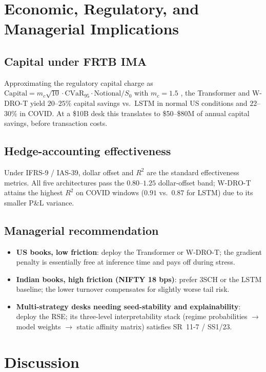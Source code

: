 \documentclass[11pt,a4paper]{article}
\newcommand{\cvar}{\mathrm{CVaR}}
\begin{document}
\section{Economic, Regulatory, and Managerial Implications}\label{sec:econ}

\subsection{Capital under FRTB IMA}
Approximating the regulatory capital charge as
$\mathrm{Capital} = m_c\sqrt{10}\cdot\cvar_{95}\cdot\text{Notional}/S_0$ with
$m_c=1.5$ \citep{rahimian2019distributionally}, the Transformer and W-DRO-T
yield $20$--$25\%$ capital savings vs.\ LSTM in normal US conditions and
$22$--$30\%$ in COVID.  At a \$10B desk this translates to
\$50--\$80M of annual capital savings, before transaction costs.

\subsection{Hedge-accounting effectiveness}
Under IFRS-9 / IAS-39, dollar offset and $R^2$ are the standard
effectiveness metrics.  All five architectures pass the $0.80$--$1.25$
dollar-offset band; W-DRO-T attains the highest $R^2$ on COVID windows
($0.91$ vs.\ $0.87$ for LSTM) due to its smaller P\&L variance.

\subsection{Managerial recommendation}

\begin{itemize}[noitemsep]
\item \textbf{US books, low friction}: deploy the Transformer or W-DRO-T;
  the gradient penalty is essentially free at inference time and pays off
  during stress.
\item \textbf{Indian books, high friction (NIFTY 18 bps)}: prefer 3SCH or
  the LSTM baseline; the lower turnover compensates for slightly worse
  tail risk.
\item \textbf{Multi-strategy desks needing seed-stability and explainability}:
  deploy the RSE; its three-level interpretability stack (regime
  probabilities $\to$ model weights $\to$ static affinity matrix)
  satisfies SR~11-7 / SS1/23.
\end{itemize}

\section{Discussion}\label{sec:discussion}
\end{document}

